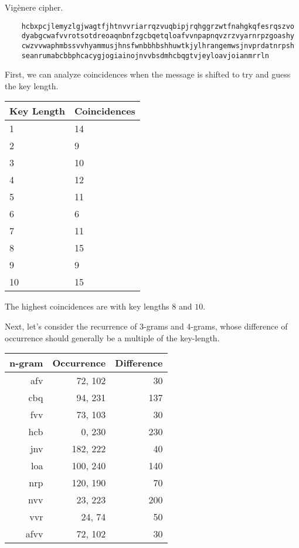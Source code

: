 \begin{problem}
  Vig\`enere cipher.

  \color{zaffre}
  \begin{Verbatim}
    hcbxpcjlemyzlgjwagtfjhtnvvriarrqzvuqbipjrqhggrzwtfnahgkqfesrqszvo
    dyabgcwafvvrotsotdreoaqnbnfzgcbqetqloafvvnpapnqvzrzvyarnrpzgoashy
    cwzvvwaphmbssvvhyammusjhnsfwnbbhbshhuwtkjylhrangemwsjnvprdatnrpsh
    seanrumabcbbphcacygjogiainojnvvbsdmhcbqgtvjeyloavjoianmrrln  \end{Verbatim}
  \color{black}
\end{problem}

\begin{Answer}
  First, we can analyze coincidences when the message is shifted to try
  and guess the key length.

    \begin{tabular}{|l|l|}
      \hline
      \textbf{Key Length} & \textbf{Coincidences} \\
      \hline
      1 & 14 \\
      2 & 9 \\
      3 & 10 \\
      4 & 12 \\
      5 & 11 \\
      6 & 6 \\
      7 & 11 \\
      8 & 15 \\
      9 & 9 \\
      10 & 15 \\
      \hline
    \end{tabular}

    \noindent
    The highest coincidences are with key lengths $8$ and $10$.

    \noindent
    Next, let's consider the recurrence of 3-grams and 4-grams, whose difference
    of occurrence should generally be a multiple of the key-length.

    \begin{tabular}{||r|r|r||}
      \hline
      n-gram & Occurrence & Difference \\
      \hline
      afv & 72, 102 & 30\\
      cbq & 94, 231 & 137\\
      fvv & 73, 103 & 30\\
      hcb & 0, 230 & 230\\
      jnv & 182, 222 & 40\\
      loa & 100, 240 & 140\\
      nrp & 120, 190 & 70\\
      nvv & 23, 223 & 200\\
      vvr & 24, 74 & 50\\
      afvv & 72, 102 & 30\\
    \hline
  \end{tabular}


\end{Answer}
